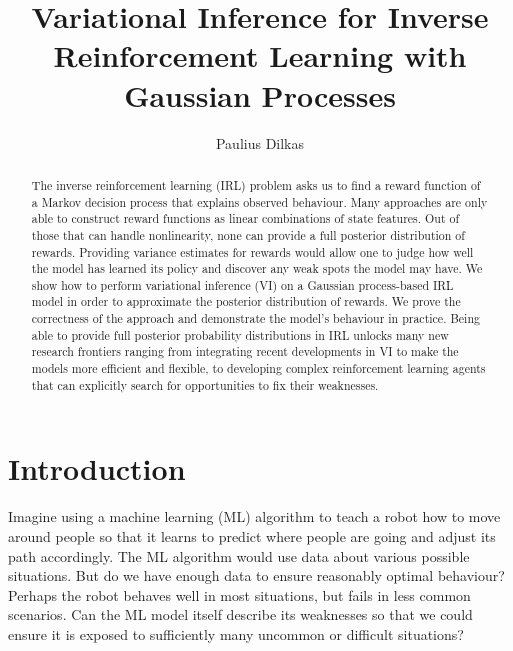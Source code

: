\documentclass{mpaper}
\begin{document}

\title{Variational Inference for Inverse Reinforcement Learning with Gaussian Processes}
\author{Paulius Dilkas}
\maketitle

\begin{abstract}
  The inverse reinforcement learning (IRL) problem asks us to find a reward
  function of a Markov decision process that explains observed behaviour. Many
  approaches are only able to construct reward functions as linear combinations
  of state features. Out of those that can handle nonlinearity, none can provide
  a full posterior distribution of rewards. Providing variance estimates for
  rewards would allow one to judge how well the model has learned its policy and
  discover any weak spots the model may have. We show how to perform variational
  inference (VI) on a Gaussian process-based IRL model in order to approximate
  the posterior distribution of rewards. We prove the correctness of the
  approach and demonstrate the model's behaviour in practice. Being able to
  provide full posterior probability distributions in IRL unlocks many new
  research frontiers ranging from integrating recent developments in VI to make
  the models more efficient and flexible, to developing complex reinforcement
  learning agents that can explicitly search for opportunities to fix their
  weaknesses.
\end{abstract}

\section{Introduction} %

Imagine using a machine learning (ML) algorithm to teach a robot how to move
around people so that it learns to predict where people are going and adjust its
path accordingly. The ML algorithm would use data about various possible
situations. But do we have enough data to ensure reasonably optimal behaviour?
Perhaps the robot behaves well in most situations, but fails in less common
scenarios. Can the ML model itself describe its weaknesses so that we could
ensure it is exposed to sufficiently many uncommon or difficult situations?
\end{document}
